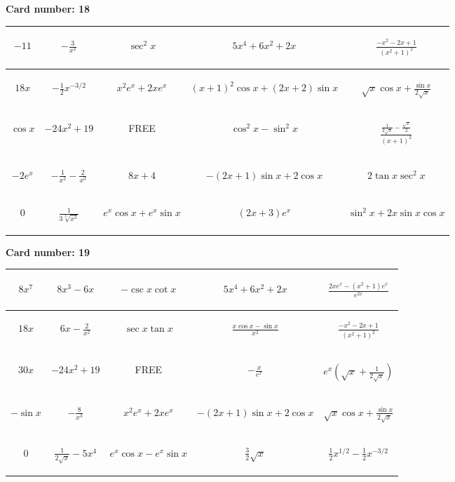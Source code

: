 \documentclass{article}
\newcommand{\entry}[1]{\begin{minipage}[t][2.75cm][t]{4cm} \vspace{1cm} \begin{center}#1\end{center} \end{minipage}}
\newcommand{\freespace}{\entry{FREE}}
\newcommand{\cardnumber}[1]{\noindent \textbf{Card number: #1} \bigskip}
\begin{document}
\pagebreak

\cardnumber{18}
\begin{center}
\begin{tabular}{|*{5}{c|}}
    \hline
    \entry{$-11$} & \entry{$-\frac{3}{x^2}$} & \entry{$\sec^2 x$} & \entry{$5x^4 + 6x^2 + 2x$} & \entry{$\frac{-x^2 - 2x + 1}{(x^2 + 1)^2}$} \\ \hline
    \entry{$18x$} & \entry{$-\frac{1}{2} x^{-3/2}$} & \entry{$x^2 e^x + 2x e^x$} & \entry{$(x + 1)^2 \cos x + (2x + 2) \sin x$} & \entry{$\sqrt{x} \cos x + \frac{\sin x}{2 \sqrt{x}}$} \\ \hline
    \entry{$\cos x$} & \entry{$-24x^2 + 19$} & \freespace & \entry{$\cos^2 x - \sin^2 x$} & \entry{$\frac{\frac{1}{2 \sqrt{x}} - \frac{\sqrt{x}}{2}}{(x + 1)^2}$} \\ \hline
    \entry{$-2e^x$} & \entry{$-\frac{1}{x^2} - \frac{2}{x^3}$} & \entry{$8x + 4$} & \entry{$-(2x + 1) \sin x + 2 \cos x$} & \entry{$2 \tan x \sec^2 x$} \\ \hline
    \entry{$0$} & \entry{$\frac{1}{3\sqrt[3]{x^2}}$} & \entry{$e^x \cos x + e^x \sin x$} & \entry{$(2x + 3) e^x$} & \entry{$\sin^2 x + 2x \sin x \cos x$} \\ \hline
\end{tabular}
\end{center}

\pagebreak

\cardnumber{19}
\begin{center}
\begin{tabular}{|*{5}{c|}}
    \hline
    \entry{$8x^7$} & \entry{$8x^3 - 6x$} & \entry{$-\csc x \cot x$} & \entry{$5x^4 + 6x^2 + 2x$} & \entry{$\frac{2x e^x - (x^2 + 1) e^x}{e^{2x}}$} \\ \hline
    \entry{$18x$} & \entry{$6x - \frac{2}{x^2}$} & \entry{$\sec x \tan x$} & \entry{$\frac{x \cos x - \sin x}{x^2}$} & \entry{$\frac{-x^2 - 2x + 1}{(x^2 + 1)^2}$} \\ \hline
    \entry{$30x$} & \entry{$-24x^2 + 19$} & \freespace & \entry{$-\frac{x}{e^x}$} & \entry{$e^x \left(\sqrt{x} + \frac{1}{2\sqrt{x}}\right)$} \\ \hline
    \entry{$-\sin x$} & \entry{$-\frac{8}{x^3}$} & \entry{$x^2 e^x + 2x e^x$} & \entry{$-(2x + 1) \sin x + 2 \cos x$} & \entry{$\sqrt{x} \cos x + \frac{\sin x}{2 \sqrt{x}}$} \\ \hline
    \entry{$0$} & \entry{$\frac{1}{2\sqrt{x}} - 5x^4$} & \entry{$e^x \cos x - e^x \sin x$} & \entry{$\frac{3}{2} \sqrt{x}$} & \entry{$\frac{1}{2} x^{1/2} - \frac{1}{2} x^{-3/2}$} \\ \hline
\end{tabular}
\end{center}
\end{document}
